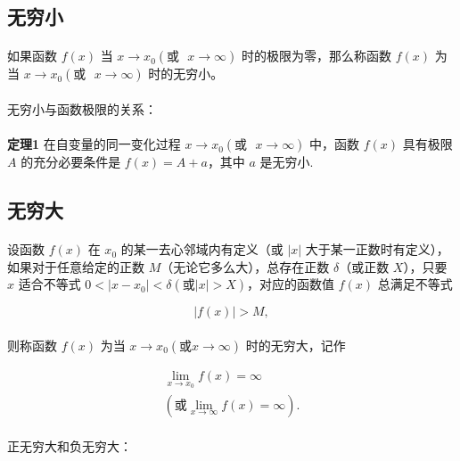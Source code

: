 \subsection{无穷小}
\paragraph{}
如果函数 $f(x)$ 当 $x \to x_0(\text{或~~} x \to \infty)$ 时的极限为零，那么称函数 $f(x)$ 为当 $x \to x_0(\text{或~~} x \to \infty)$ 时的无穷小。

\paragraph{}
无穷小与函数极限的关系：

\paragraph{}
\textbf{定理1} 在自变量的同一变化过程 $x \to x_0(\text{或~~} x \to \infty)$ 中，函数 $f(x)$ 具有极限 $A$ 的充分必要条件是 $f(x) = A + a$，其中 $a$ 是无穷小.

\subsection{无穷大}
\paragraph{}
设函数 $f(x )$ 在 $x_0$ 的某一去心邻域内有定义（或 $|x|$ 大于某一正数时有定义），如果对于任意给定的正数 $M$（无论它多么大），总存在正数 $\delta$（或正数 $X$），只要 $x$ 适合不等式 $0 < |x - x_0| < \delta (\text{或} |x| > X)$，对应的函数值 $f(x)$ 总满足不等式

\begin{equation}
|f(x)| > M,
\end{equation}

\paragraph{}
则称函数 $f(x)$ 为当 $x \to x_0(\text{或} x \to \infty)$ 时的无穷大，记作

\begin{gather}
\lim_{x \to x_0}f(x) = \infty \\
(\text{或} \lim_{x \to \infty}f(x) = \infty).
\end{gather}

\paragraph{}
正无穷大和负无穷大：

